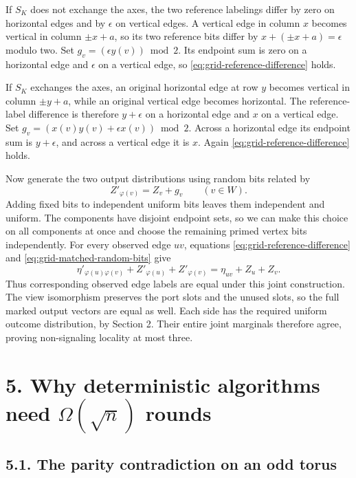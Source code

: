 \documentclass[11pt,a4paper]{article}
\begin{document}
If \(S_K\) does not exchange the axes, the two reference labelings differ by zero on horizontal edges and by \(\epsilon\) on vertical edges.
A vertical edge in column \(x\) becomes vertical in column \(\pm x+a\), so its two reference bits differ by \(x+(\pm x+a)=\epsilon\) modulo two.
Set \(g_v=(\epsilon y(v))\bmod2\).
Its endpoint sum is zero on a horizontal edge and \(\epsilon\) on a vertical edge, so \eqref{eq:grid-reference-difference} holds.

If \(S_K\) exchanges the axes, an original horizontal edge at row \(y\) becomes vertical in column \(\pm y+a\), while an original vertical edge becomes horizontal.
The reference-label difference is therefore \(y+\epsilon\) on a horizontal edge and \(x\) on a vertical edge.
Set \(g_v=(x(v)y(v)+\epsilon x(v))\bmod2\).
Across a horizontal edge its endpoint sum is \(y+\epsilon\), and across a vertical edge it is \(x\).
Again \eqref{eq:grid-reference-difference} holds.

Now generate the two output distributions using random bits related by
\begin{equation} Z'_{\varphi(v)}=Z_v+g_v \qquad(v\in W). \label{eq:grid-matched-random-bits} \end{equation}
Adding fixed bits to independent uniform bits leaves them independent and uniform.
The components have disjoint endpoint sets, so we can make this choice on all components at once and choose the remaining primed vertex bits independently.
For every observed edge \(uv\), equations \eqref{eq:grid-reference-difference} and \eqref{eq:grid-matched-random-bits} give
\[ \eta'_{\varphi(u)\varphi(v)}+Z'_{\varphi(u)}+Z'_{\varphi(v)}=\eta_{uv}+Z_u+Z_v. \]
Thus corresponding observed edge labels are equal under this joint construction.
The view isomorphism preserves the port slots and the unused slots, so the full marked output vectors are equal as well.
Each side has the required uniform outcome distribution, by Section 2.
Their entire joint marginals therefore agree, proving non-signaling locality at most three.

\section{\texorpdfstring{5. Why deterministic algorithms need \(\Omega(\sqrt n)\) rounds}{5. Why deterministic algorithms need Omega(sqrt(n)) rounds}}\label{grid-lower-bound}

\subsection{5.1. The parity contradiction on an odd torus}
\end{document}
